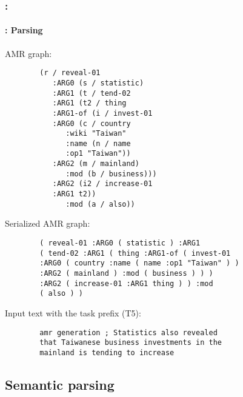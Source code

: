 \documentclass[xcolor=table]{beamer}
\begin{document}
\begin{frame}[fragile]
	\frametitle{\insertshortsubtitle: \insertsection}
	\framesubtitle{\insertsubsection: Parsing \cite{2023-lee-amr}}
	
	\begin{minipage}{.40\textwidth}
	AMR graph:
	\bfseries\scriptsize
	\begin{verbatim}
		(r / reveal-01
		   :ARG0 (s / statistic)
		   :ARG1 (t / tend-02
		   :ARG1 (t2 / thing
		   :ARG1-of (i / invest-01
		   :ARG0 (c / country
		      :wiki "Taiwan"
		      :name (n / name
		      :op1 "Taiwan"))
		   :ARG2 (m / mainland)
		      :mod (b / business)))
		   :ARG2 (i2 / increase-01
		   :ARG1 t2))
		      :mod (a / also))
	\end{verbatim}
	\end{minipage}
	\begin{minipage}{.58\textwidth}
	Serialized AMR graph:
	\bfseries\scriptsize
	\begin{verbatim}
		( reveal-01 :ARG0 ( statistic ) :ARG1
		( tend-02 :ARG1 ( thing :ARG1-of ( invest-01
		:ARG0 ( country :name ( name :op1 "Taiwan" ) )
		:ARG2 ( mainland ) :mod ( business ) ) )
		:ARG2 ( increase-01 :ARG1 thing ) ) :mod
		( also ) )
	\end{verbatim}
	
	\normalfont\normalsize
	Input text with the task prefix (T5):
	\bfseries\scriptsize
	\begin{verbatim}
		amr generation ; Statistics also revealed
		that Taiwanese business investments in the
		mainland is tending to increase
	\end{verbatim}
	\end{minipage}
	
\end{frame}


\subsection{Semantic parsing}
\end{document}
